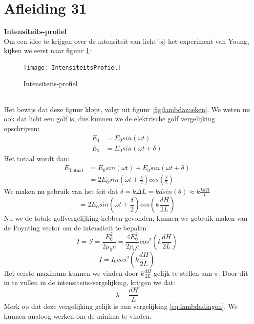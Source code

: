 \documentclass[a4paper,kul]{kulakarticle} %
\begin{document}
\section{Afleiding 31}
\label{sec:intensiteitWrong}
\textbf{Intensiteits-profiel}\\
Om een idee te krijgen over de intensiteit van licht bij het experiment van Young, kijken we eerst naar figuur \ref{fig:intensiteitsprofiel}:
\begin{figure}[!h]
	\centering
	\texttt{[image: IntensiteitsProfiel]}
	\caption[Intensiteits-profiel]{Intensiteits-profiel}
	\label{fig:intensiteitsprofiel}
\end{figure}\\
Het bewijs dat deze figuur klopt, volgt uit figuur \ref{fig:lambdazoeken}. We weten nu ook dat licht een golf is, dus kunnen we de elektrische golf vergelijking opschrijven:
\begin{align*}
	E_1&=E_0sin(\omega t)\\
	E_2&=E_0sin(\omega t+\delta)
\end{align*}
Het totaal wordt dan:
\begin{align*}
	E_{\text{Totaal}}&=E_0sin(\omega t)+E_0sin(\omega t+\delta)\\
	&=2E_0sin(\omega t +\frac{\delta}{2})cos(\frac{\delta}{2})
\end{align*}
We maken nu gebruik van het feit dat $\delta = k\Delta L = kdsin(\theta)\approx k\frac{kdH}{L}$
\begin{equation*}
	=2E_0sin(\omega t +\frac{\delta}{2})cos(k\frac{dH}{2L})
\end{equation*}
Nu we de totale golfvergelijking hebben gevonden, kunnen we gebruik maken van de Poynting vector om de intensiteit te bepalen
\begin{equation*}
	I=\bar{S}=\frac{E^2_0}{2\mu_0c}=\frac{4E^2_0}{2\mu_0c}cos^2(k\frac{dH}{2L})
\end{equation*}
\begin{equation*}
	I = I_0cos^2(k\frac{dH}{2L})
\end{equation*}
Het eerste maximum kunnen we vinden door $k\frac{dH}{2L}$ gelijk te stellen aan $\pi$. Door dit in te vullen in de intensiteits-vergelijking, krijgen we dat:
\begin{equation*}
	\lambda=\frac{dH}{L}
\end{equation*}
Merk op dat deze vergelijking gelijk is aan vergelijking \ref{eq:lambdadingen}. We kunnen analoog werken om de minima te vinden.
\newpage
\end{document}
